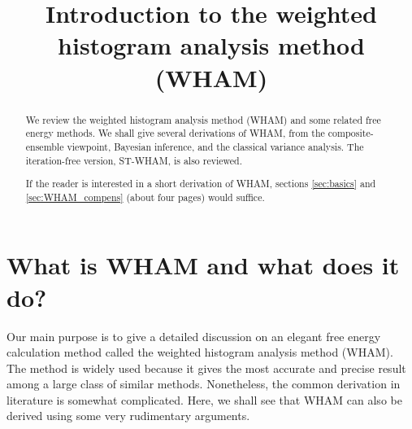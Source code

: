 \documentclass[aip,jcp,preprint,superscriptaddress]{revtex4-1}
\begin{document}
\newcommand{\vct}[1]{\mathbf{#1}}
\newcommand{\vx}{\vct{x}}
\newcommand{\vy}{\vct{y}}
\newcommand{\Z}{\mathcal{Z}}
\newcommand{\E}{\mathcal{E}}
\newcommand{\Ham}{\mathcal{H}}
\newcommand{\W}{\mathcal{W}}
\newcommand{\A}{\mathcal{A}}
\newcommand{\LL}{\mathcal{L}}
\newcommand{\var}{\mathrm{var}}
\newcommand{\com}{\mathrm{com}}

\newcommand{\llbra}{[\![}
\newcommand{\llket}{]\!]}

\newcommand{\repl}[2]{{\color{gray} [#1] }{\color{blue} #2}}
\newcommand{\add}[1]{{\color{blue} #1}}
\newcommand{\del}[1]{{\color{gray} [#1]}}
\newcommand{\note}[1]{{\color{OliveGreen}\small [\textbf{Comment.} #1]}}





\title{Introduction to the weighted histogram analysis method (WHAM)}


\begin{abstract}
  We review the weighted histogram analysis method (WHAM)
  and some related free energy methods.
  We shall give several derivations of WHAM,
  from the composite-ensemble viewpoint,
  Bayesian inference,
  and the classical variance analysis.
  The iteration-free version, ST-WHAM,
  is also reviewed.

  If the reader is interested in a short
  derivation of WHAM, sections
  \ref{sec:basics} and \ref{sec:WHAM_compens} (about four pages)
  would suffice.
\end{abstract}

\maketitle

\tableofcontents



\section{\label{sec:intro}
What is WHAM and what does it do?}



Our main purpose is
to give a detailed discussion on
an elegant free energy calculation method called
the weighted histogram analysis method (WHAM)\cite{
ferrenberg1988, *ferrenberg1989, kumar1992,
newman, frenkel}.
%
The method is widely used because
it gives the most accurate and precise result
among a large class of similar methods.
%
Nonetheless,
the common derivation in literature
is somewhat complicated.
%
Here, we shall see that
WHAM can also be derived
using some very rudimentary arguments.
\end{document}
